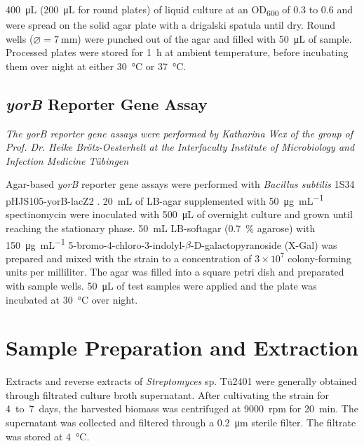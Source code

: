 \SI{400}{\micro\liter} (\SI{200}{\micro\liter} for round plates) of liquid culture at an OD\textsubscript{600} of 0.3 to 0.6 and were spread on the solid agar plate with a drigalski spatula until dry.
Round wells ($\varnothing=\SI{7}{\milli\meter}$) were punched out of the agar and filled with \SI{50}{\micro\liter} of sample.
Processed plates were stored for \SI{1}{\hour} at ambient temperature, before incubating them over night at either \SI{30}{\celsius} or \SI{37}{\celsius}.


\subsection{\emph{yorB} Reporter Gene Assay} %
\label{sub:yorb_reporter_gene_assay}

\emph{The \emph{yorB} reporter gene assays were performed by Katharina Wex of the group of Prof. Dr. Heike Brötz-Oesterhelt at the Interfaculty Institute of Microbiology and Infection Medicine Tübingen}

Agar-based \textit{yorB} reporter gene assays were performed with \textit{Bacillus subtilis} 1S34 pHJS105-yorB-lacZ2 \autocite{Urban2007}.
\SI{20}{\milli\liter} of LB-agar supplemented with \SI{50}{\micro\gram\per\milli\liter} spectinomycin were inoculated with \SI{500}{\micro\liter} of overnight culture and grown until reaching the stationary phase.
\SI{50}{\milli\liter} LB-softagar (0.7~\% agarose) with \SI{150}{\micro\gram\per\milli\liter} 5-bromo-4-chloro-3-indolyl-$\beta$-D-galactopyranoside (X-Gal) was prepared and mixed with the strain to a concentration of $3\times10^7$	colony-forming units per milliliter.
The agar was filled into a square petri dish and preparated with sample wells.
\SI{50}{\micro\liter} of test samples were applied and the plate was incubated at \SI{30}{\celsius} over night.



\section{Sample Preparation and Extraction} %
\label{sec:sample_preparation_and_extraction}

Extracts and reverse extracts of \emph{Streptomyces} sp. Tü2401 were generally obtained through filtrated culture broth supernatant.
After  cultivating the strain for 4~to~7~days, the harvested biomass was centrifuged at 9000~rpm for \SI{20}{\minute}.
The supernatant was collected and filtered through a \SI{0.2}{\micro\meter} sterile filter.
The filtrate was stored at \SI{4}{\celsius}.

